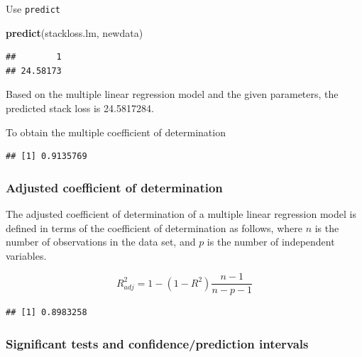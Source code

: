\documentclass[]{article}
\newenvironment{Shaded}{\begin{snugshade}}{\end{snugshade}}
\newcommand{\KeywordTok}[1]{\textcolor[rgb]{0.13,0.29,0.53}{\textbf{{#1}}}}
\newcommand{\NormalTok}[1]{{#1}}
\numberwithin{equation}{section}
\begin{document}
Use \texttt{predict}

\begin{Shaded}
\begin{Highlighting}[]
\KeywordTok{predict}\NormalTok{(stackloss.lm, newdata) }
\end{Highlighting}
\end{Shaded}

\begin{verbatim}
##        1 
## 24.58173
\end{verbatim}

Based on the multiple linear regression model and the given parameters,
the predicted stack loss is 24.5817284.

To obtain the multiple coefficient of determination

\begin{Shaded}
\end{Shaded}

\begin{verbatim}
## [1] 0.9135769
\end{verbatim}

\subsubsection{Adjusted coefficient of
determination}\label{adjusted-coefficient-of-determination}

The adjusted coefficient of determination of a multiple linear
regression model is defined in terms of the coefficient of determination
as follows, where \(n\) is the number of observations in the data set,
and \(p\) is the number of independent variables.

\[
R^2_{adj} = 1-(1-R^2)\frac{n-1}{n-p-1}
\]

\begin{Shaded}
\end{Shaded}

\begin{verbatim}
## [1] 0.8983258
\end{verbatim}

\subsubsection{Significant tests and confidence/prediction
intervals}\label{significant-tests-and-confidenceprediction-intervals}
\end{document}
